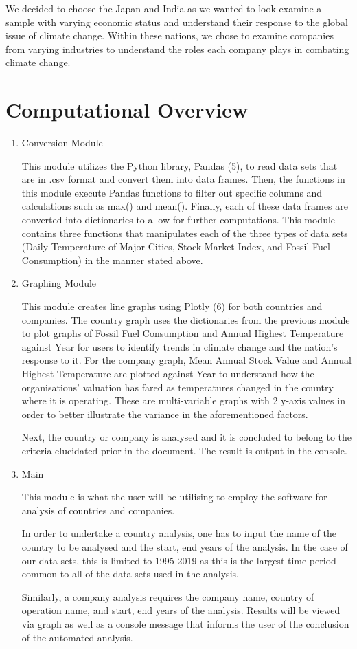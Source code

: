 \documentclass[fontsize=11pt]{article}
\begin{document}
We decided to choose the Japan and India as we wanted to look examine a sample with varying economic status and understand their response to the global issue of climate change. Within these nations, we chose to examine companies from varying industries to understand the roles each company plays in combating climate change.\\

\section*{Computational Overview}

\begin{enumerate}
\item Conversion Module

This module utilizes the Python library, Pandas (5), to read data sets that are in .csv format and convert them into data frames. Then, the functions in this module execute Pandas functions to filter out specific columns and calculations such as max() and mean(). Finally, each of these data frames are converted into dictionaries to allow for further computations. This module contains three functions that manipulates each of the three types of data sets (Daily Temperature of Major Cities, Stock Market Index, and Fossil Fuel Consumption) in the manner stated above.

\item Graphing Module

This module creates line graphs using Plotly (6) for both countries
and companies. The country graph uses the dictionaries from the previous module to plot graphs of Fossil Fuel Consumption and Annual Highest Temperature against Year for users to identify trends in climate change and the nation's response to it. For the company graph, Mean Annual Stock Value and Annual Highest Temperature are plotted against Year to understand how the organisations' valuation has fared as temperatures changed in the country where it is operating. These are multi-variable graphs with 2 y-axis values in order to better illustrate the variance in the aforementioned factors.

Next, the country or company is analysed and it is concluded to belong
to the criteria elucidated prior in the document. The result is output
in the console.


\item Main

This module is what the user will be utilising to employ the software
for analysis of countries and companies.

In order to undertake a country analysis, one has to input the name of
the country to be analysed and the start, end years of the analysis. In
the case of our data sets, this is limited to 1995-2019 as this is the
largest time period common to all of the data sets used in the analysis.

Similarly, a company analysis requires the company name, country of
operation name, and start, end years of the analysis. Results will be
viewed via graph as well as a console message that informs the user of
the conclusion of the automated analysis.

\end{enumerate}
\end{document}
